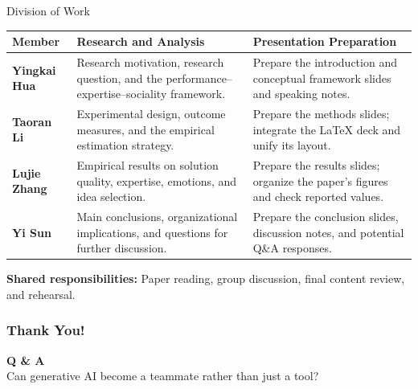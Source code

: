 \begin{frame}[t]{Division of Work}
\small
\begingroup
\renewcommand{\arraystretch}{1.35}
\begin{tabularx}{\linewidth}{@{}>{\bfseries}p{2.15cm}XX@{}}
\toprule
Member & \textbf{Research and Analysis} & \textbf{Presentation Preparation} \\
\midrule
Yingkai Hua
& Research motivation, research question, and the performance--expertise--sociality framework.
& Prepare the introduction and conceptual framework slides and speaking notes. \\
\addlinespace[0.15cm]
Taoran Li
& Experimental design, outcome measures, and the empirical estimation strategy.
& Prepare the methods slides; integrate the LaTeX deck and unify its layout. \\
\addlinespace[0.15cm]
Lujie Zhang
& Empirical results on solution quality, expertise, emotions, and idea selection.
& Prepare the results slides; organize the paper's figures and check reported values. \\
\addlinespace[0.15cm]
Yi Sun
& Main conclusions, organizational implications, and questions for further discussion.
& Prepare the conclusion slides, discussion notes, and potential Q\&A responses. \\
\bottomrule
\end{tabularx}
\endgroup

\vspace{0.24cm}
\textcolor{paperred}{\bfseries Shared responsibilities:}
Paper reading, group discussion, final content review, and rehearsal.
\end{frame}

\begin{frame}
  \frametitle{Thank You!}
  \vfill
  \centering
  {\Huge \textbf{Q \& A}}\\[1em]
  {\large Can generative AI become a teammate rather than just a tool?}
  \vfill
\end{frame}
